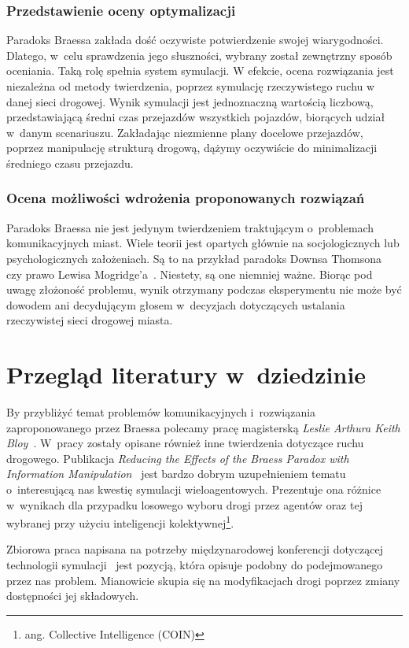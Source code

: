 \documentclass[twoside,12pt]{report}
\begin{document}
\subsubsection{Przedstawienie oceny optymalizacji}
Paradoks Braessa zakłada dość oczywiste potwierdzenie swojej wiarygodności. Dlatego, w~celu sprawdzenia jego słuszności, wybrany został zewnętrzny sposób oceniania. Taką rolę spełnia system symulacji. W efekcie, ocena rozwiązania jest niezależna od metody twierdzenia, poprzez symulację rzeczywistego ruchu w danej sieci drogowej. Wynik symulacji jest jednoznaczną wartością liczbową, przedstawiającą średni czas przejazdów wszystkich pojazdów, biorących udział w~danym scenariuszu. Zakładając niezmienne plany docelowe przejazdów, poprzez manipulację strukturą drogową, dążymy oczywiście do minimalizacji średniego czasu przejazdu.

\subsubsection{Ocena możliwości wdrożenia proponowanych rozwiązań}
Paradoks Braessa nie jest jedynym twierdzeniem traktującym o~problemach komunikacyjnych miast. Wiele teorii jest opartych głównie na socjologicznych lub psychologicznych założeniach. Są to na przykład paradoks Downsa Thomsona~\cite{downs} czy prawo Lewisa Mogridge’a~\cite{lewis}. Niestety, są one niemniej ważne. Biorąc pod uwagę złożoność problemu, wynik otrzymany podczas eksperymentu nie może być dowodem ani decydującym głosem w~decyzjach dotyczących ustalania rzeczywistej sieci drogowej miasta. 


\section{Przegląd literatury w~dziedzinie}
By przybliżyć temat problemów komunikacyjnych i~rozwiązania zaproponowanego przez Braessa polecamy pracę magisterską \textit{Leslie Arthura Keith Bloy}~\cite{investigation}. W~pracy zostały opisane również inne twierdzenia dotyczące ruchu drogowego. Publikacja \textit{Reducing the Effects of the Braess Paradox with Information Manipulation}~\cite{reducingtheeffects} jest bardzo dobrym uzupełnieniem tematu o~interesującą nas kwestię symulacji wieloagentowych. Prezentuje ona różnice w~wynikach dla przypadku losowego wyboru drogi przez agentów oraz tej wybranej przy użyciu inteligencji kolektywnej\footnote{ang. Collective Intelligence (COIN)}. 

Zbiorowa praca napisana na potrzeby międzynarodowej konferencji dotyczącej technologii symulacji~\cite{reducingtheeffects} jest pozycją, która opisuje podobny do podejmowanego przez nas problem. Mianowicie skupia się na modyfikacjach drogi poprzez zmiany dostępności jej składowych.
\end{document}
